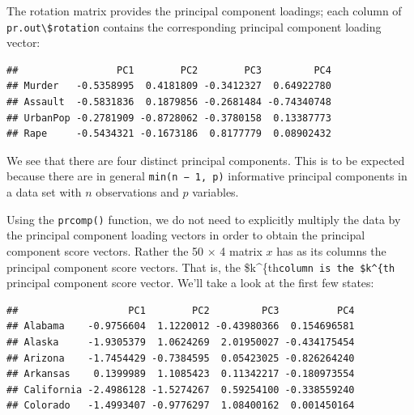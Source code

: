 \documentclass[openany]{book}
\newenvironment{Shaded}{\begin{snugshade}}{\end{snugshade}}
\newcommand{\KeywordTok}[1]{\textcolor[rgb]{0.13,0.29,0.53}{\textbf{#1}}}
\newcommand{\NormalTok}[1]{#1}
\newcommand{\OperatorTok}[1]{\textcolor[rgb]{0.81,0.36,0.00}{\textbf{#1}}}
\begin{document}
The rotation matrix provides the principal component loadings; each column
of \texttt{pr.out\textbackslash{}\$rotation} contains the corresponding principal component
loading vector:

\begin{Shaded}
\end{Shaded}

\begin{verbatim}
##                 PC1        PC2        PC3         PC4
## Murder   -0.5358995  0.4181809 -0.3412327  0.64922780
## Assault  -0.5831836  0.1879856 -0.2681484 -0.74340748
## UrbanPop -0.2781909 -0.8728062 -0.3780158  0.13387773
## Rape     -0.5434321 -0.1673186  0.8177779  0.08902432
\end{verbatim}

We see that there are four distinct principal components. This is to be
expected because there are in general \texttt{min(n\ −\ 1,\ p)} informative principal
components in a data set with \(n\) observations and \(p\) variables.

Using the \texttt{prcomp()} function, we do not need to explicitly multiply the
data by the principal component loading vectors in order to obtain the
principal component score vectors. Rather the 50 × 4 matrix \(x\) has as its
columns the principal component score vectors. That is, the \$k\^{}\{th\texttt{column\ is\ the\ \$k\^{}\{th} principal component score vector. We'll take a look at the first few states:

\begin{Shaded}
\end{Shaded}

\begin{verbatim}
##                   PC1        PC2         PC3          PC4
## Alabama    -0.9756604  1.1220012 -0.43980366  0.154696581
## Alaska     -1.9305379  1.0624269  2.01950027 -0.434175454
## Arizona    -1.7454429 -0.7384595  0.05423025 -0.826264240
## Arkansas    0.1399989  1.1085423  0.11342217 -0.180973554
## California -2.4986128 -1.5274267  0.59254100 -0.338559240
## Colorado   -1.4993407 -0.9776297  1.08400162  0.001450164
\end{verbatim}
\end{document}
